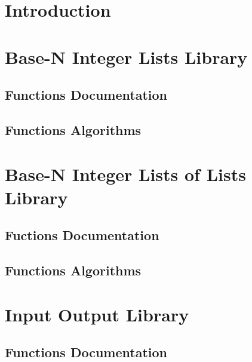 \documentclass[backcover, english, report, nodocumentinfo]{upmethodology-document}
\begin{document}
\tableofcontents

\chapter{Introduction}
\chapter{Base-N Integer Lists Library}
\section{Functions Documentation}
\section{Functions Algorithms}
\chapter{Base-N Integer Lists of Lists Library}
\section{Fuctions Documentation}
\section{Functions Algorithms}
\chapter{Input Output Library}
\section{Functions Documentation}
\end{document}
